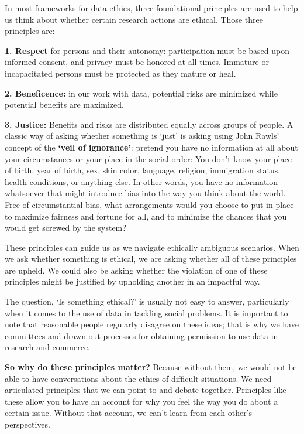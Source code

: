 \documentclass[
]{book}
\begin{document}
In most frameworks for data ethics, three foundational principles are used to help us think about whether certain research actions are ethical. Those three principles are:

\textbf{1. Respect} for persons and their autonomy: participation must be based upon informed consent, and privacy must be honored at all times. Immature or incapacitated persons must be protected as they mature or heal.

\textbf{2. Beneficence:} in our work with data, potential risks are minimized while potential benefits are maximized.

\textbf{3. Justice:} Benefits and risks are distributed equally across groups of people. A classic way of asking whether something is `just' is asking using John Rawls' concept of the \textbf{`veil of ignorance'}: pretend you have no information at all about your circumstances or your place in the social order: You don't know your place of birth, year of birth, sex, skin color, language, religion, immigration status, health conditions, or anything else. In other words, you have no information whatsoever that might introduce bias into the way you think about the world. Free of circumstantial bias, what arrangements would you choose to put in place to maximize fairness and fortune for all, and to minimize the chances that you would get screwed by the system?

These principles can guide us as we navigate ethically ambiguous scenarios. When we ask whether something is ethical, we are asking whether all of these principles are upheld. We could also be asking whether the violation of one of these principles might be justified by upholding another in an impactful way.

The question, `Is something ethical?' is usually not easy to answer, particularly when it comes to the use of data in tackling social problems. It is important to note that reasonable people regularly disagree on these ideas; that is why we have committees and drawn-out processes for obtaining permission to use data in research and commerce.

\textbf{So why do these principles matter?} Because without them, we would not be able to have conversations about the ethics of difficult situations. We need articulated principles that we can point to and debate together. Principles like these allow you to have an account for why you feel the way you do about a certain issue. Without that account, we can't learn from each other's perspectives.
\end{document}
